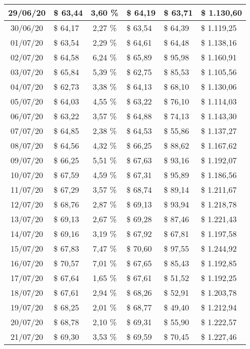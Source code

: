 \begin{center}
\begin{small}
\begin{longtable}{|c|l|c|l|l|l|}
29/06/20 & \$ 63,44 & 3,60 \% & \$ 64,19 & \$ 63,71 & \$ 1.130,60 \\ \hline
30/06/20 & \$ 64,17 & 2,27 \% & \$ 63,54 & \$ 64,39 & \$ 1.119,25 \\ \hline
01/07/20 & \$ 63,54 & 2,29 \% & \$ 64,61 & \$ 64,48 & \$ 1.138,16 \\ \hline
02/07/20 & \$ 64,58 & 6,24 \% & \$ 65,89 & \$ 95,98 & \$ 1.160,91 \\ \hline
03/07/20 & \$ 65,84 & 5,39 \% & \$ 62,75 & \$ 85,53 & \$ 1.105,56 \\ \hline
04/07/20 & \$ 62,73 & 3,38 \% & \$ 64,13 & \$ 68,10 & \$ 1.130,06 \\ \hline
05/07/20 & \$ 64,03 & 4,55 \% & \$ 63,22 & \$ 76,10 & \$ 1.114,03 \\ \hline
06/07/20 & \$ 63,22 & 3,57 \% & \$ 64,88 & \$ 74,13 & \$ 1.143,30 \\ \hline
07/07/20 & \$ 64,85 & 2,38 \% & \$ 64,53 & \$ 55,86 & \$ 1.137,27 \\ \hline
08/07/20 & \$ 64,56 & 4,32 \% & \$ 66,25 & \$ 88,62 & \$ 1.167,62 \\ \hline
09/07/20 & \$ 66,25 & 5,51 \% & \$ 67,63 & \$ 93,16 & \$ 1.192,07 \\ \hline
10/07/20 & \$ 67,59 & 4,59 \% & \$ 67,31 & \$ 95,89 & \$ 1.186,56 \\ \hline
11/07/20 & \$ 67,29 & 3,57 \% & \$ 68,74 & \$ 89,14 & \$ 1.211,67 \\ \hline
12/07/20 & \$ 68,76 & 2,87 \% & \$ 69,13 & \$ 93,94 & \$ 1.218,78 \\ \hline
13/07/20 & \$ 69,13 & 2,67 \% & \$ 69,28 & \$ 87,46 & \$ 1.221,43 \\ \hline
14/07/20 & \$ 69,16 & 3,19 \% & \$ 67,92 & \$ 67,81 & \$ 1.197,58 \\ \hline
15/07/20 & \$ 67,83 & 7,47 \% & \$ 70,60 & \$ 97,55 & \$ 1.244,92 \\ \hline
16/07/20 & \$ 70,57 & 7,01 \% & \$ 67,65 & \$ 85,43 & \$ 1.192,85 \\ \hline
17/07/20 & \$ 67,64 & 1,65 \% & \$ 67,61 & \$ 51,52 & \$ 1.192,25 \\ \hline
18/07/20 & \$ 67,61 & 2,94 \% & \$ 68,26 & \$ 52,91 & \$ 1.203,78 \\ \hline
19/07/20 & \$ 68,25 & 2,01 \% & \$ 68,77 & \$ 49,40 & \$ 1.212,94 \\ \hline
20/07/20 & \$ 68,78 & 2,10 \% & \$ 69,31 & \$ 55,90 & \$ 1.222,57 \\ \hline
21/07/20 & \$ 69,30 & 3,53 \% & \$ 69,59 & \$ 70,45 & \$ 1.227,46 \\ \hline

\end{longtable}
\end{small}
\end{center}
